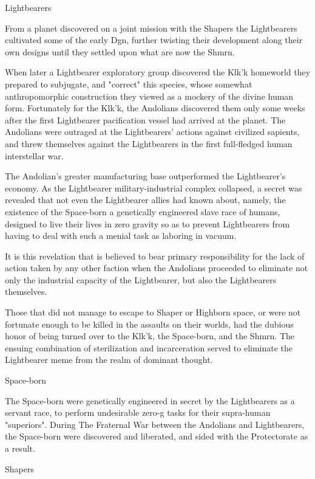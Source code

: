 Lightbearers

From a planet discovered on a joint mission with the Shapers the
Lightbearers cultivated some of the early Dgn, further twisting their
development along their own designs until they settled upon what are
now the Shmrn.

When later a Lightbearer exploratory group discovered the Klk'k
homeworld they prepared to subjugate, and "correct" this species,
whose somewhat anthropomorphic construction they viewed as a mockery
of the divine human form. Fortunately for the Klk'k, the Andolians
discovered them only some weeks after the first Lightbearer
pacification vessel had arrived at the planet. The Andolians were
outraged at the Lightbearers' actions against civilized sapients, and
threw themselves against the Lightbearers in the first full-fledged
human interstellar war.

The Andolian's greater manufacturing base outperformed the
Lightbearer's economy. As the Lightbearer military-industrial complex
collapsed, a secret was revealed that not even the Lightbearer allies
had known about, namely, the existence of the Space-born a genetically
engineered slave race of humans, designed to live their lives in zero
gravity so as to prevent Lightbearers from having to deal with such a
menial task as laboring in vacuum.

It is this revelation that is believed to bear primary responsibility
for the lack of action taken by any other faction when the Andolians
proceeded to eliminate not only the industrial capacity of the
Lightbearer, but also the Lightbearers themselves.

Those that did not manage to escape to Shaper or Highborn space, or
were not fortunate enough to be killed in the assaults on their
worlds, had the dubious honor of being turned over to the Klk'k, the
Space-born, and the Shmrn.  The ensuing combination of sterilization
and incarceration served to eliminate the Lightbearer meme from the
realm of dominant thought.

Space-born

The Space-born were genetically engineered in secret by the
Lightbearers as a servant race, to perform undesirable zero-g tasks
for their supra-human "superiors". During The Fraternal War between the
Andolians and Lightbearers, the Space-born were discovered and
liberated, and sided with the Protectorate as a result.

Shapers

